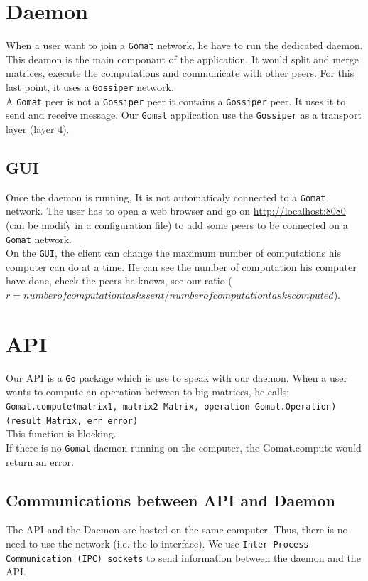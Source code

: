 \documentclass{article}
\newcommand{\Gossiper}{\texttt{Gossiper}\xspace}
\newcommand{\Gomat}{\texttt{Gomat}\xspace}
\newcommand{\Go}{\texttt{Go}\xspace}
\begin{document}
    \section{Daemon}
    When a user want to join a \Gomat network, he have to run the dedicated daemon. This deamon is the main componant of the
    application. It would split and merge matrices, execute the computations and communicate with other peers. For this last
    point, it uses a \Gossiper network.\\
    A \Gomat peer is not a \Gossiper peer it contains a \Gossiper peer. It uses it to send and receive
    message. Our \Gomat application use the \Gossiper as a transport layer (layer 4).

    \subsection{GUI}
    Once the daemon is running, It is not automaticaly connected to a \Gomat network. The user has to open a web
    browser and go on \url{http://localhost:8080} (can be modify in a configuration file) to add some peers to be connected on a
    \Gomat network.\\
    On the \texttt{GUI}, the client can change the maximum number of computations his computer can do at a time. He can see
    the number of computation his computer have done, check the peers he knows, see our ratio
    ($r = {number of computation tasks sent}/{number of computation tasks computed}$).

    \section{API}
    Our API is a \Go package which is use to speak with our daemon. When a user wants to compute an operation
    between to big matrices, he calls:\\
    \texttt{Gomat.compute(matrix1, matrix2 Matrix, operation Gomat.Operation)(result Matrix, err error)}\\
    This function is blocking.\\
    If there is no \Gomat daemon running on the computer, the Gomat.compute would return an error.
    \subsection{Communications between API and Daemon}
    The API and the Daemon are hosted on the same computer. Thus, there is no need to use the network (i.e. the lo interface).
    We use \texttt{Inter-Process Communication (IPC) sockets} to send information between the daemon and the API.
\end{document}
